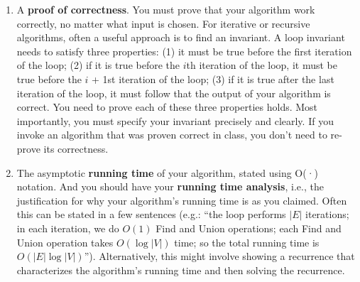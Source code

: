 \documentclass[10.5pt]{article}
\newenvironment{main idea}{\textbf{Main Idea: }}{}
\theoremstyle{remark}
\begin{document}
\begin{enumerate}
	\item A {\textbf{proof of correctness}}.  You must prove that your algorithm work correctly, no matter
	      what input is chosen.
	      For iterative or recursive algorithms, often a useful approach is to find an invariant. A loop
	      invariant needs to satisfy three properties: (1) it must be true before the first iteration of the
	      loop; (2) if it is true before the $i$th iteration of the loop, it must be true before the $i$ + 1st
	      iteration of the loop; (3) if it is true after the last iteration of the loop, it must follow that the output of your algorithm is correct. You need to prove each of these three properties holds.
	      Most importantly, you must specify your invariant precisely and clearly.
	      If you invoke an algorithm that was proven correct in class, you don’t need to re-prove its correctness.

	\item The asymptotic \textbf{running time} of your algorithm, stated using O(·) notation. And you should have your \textbf{running time analysis}, i.e., the justification for why your algorithm’s running time is
	      as you claimed. Often this can be stated in a few sentences (e.g.: “the loop performs $|E|$
	      iterations; in each iteration, we do $O(1)$ Find and Union operations; each Find and Union
	      operation takes $O(\log|V|)$ time; so the total running time is $O(|E|\log|V|)$”). Alternatively, this
	      might involve showing a recurrence that characterizes the algorithm’s running time and then
	      solving the recurrence.
\end{enumerate}
\pagebreak
\end{document}

